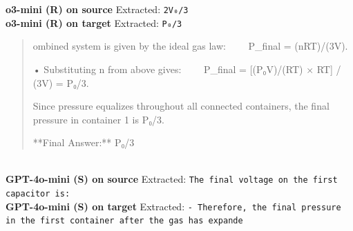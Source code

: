 \begin{tcolorbox}[
  colback=gray!5, colframe=gray!40,
  title={\textbf{Example 1: Knowledge-Dependent Gain}},
  fonttitle=\small\bfseries, breakable]
\vspace{4pt}
\textbf{o3-mini (R) on source} \textcolor{darkgreen}{\cmark} Extracted: \texttt{2V₀/3}
\\[-2pt]
\textbf{o3-mini (R) on target} \textcolor{red}{\xmark} Extracted: \texttt{P₀/3}
\begin{quote}\scriptsize\ttfamily [...] ombined system is given by the ideal gas law:
  P\_final = (nRT)/(3V).

• Substituting n from above gives:
  P\_final = [(P₀V)/(RT) × RT] / (3V) = P₀/3.

Since pressure equalizes throughout all connected containers, the final pressure in container 1 is P₀/3.

**Final Answer:** P₀/3\end{quote}
\\[-2pt]
\textbf{GPT-4o-mini (S) on source} \textcolor{red}{\xmark} Extracted: \texttt{The final voltage on the first capacitor is:}
\\[-2pt]
\textbf{GPT-4o-mini (S) on target} \textcolor{red}{\xmark} Extracted: \texttt{- Therefore, the final pressure in the first container after the gas has expande}
\\[-2pt]
\end{tcolorbox}
\vspace{8pt}
